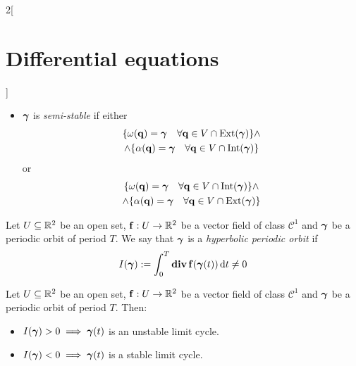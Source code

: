 \documentclass[../../../main_math.tex]{subfiles}
\begin{document}
\begin{multicols}{2}[\section{Differential equations}]
\begin{proposition}
\begin{itemize}
      \item $\boldsymbol{\mathrm{\gamma}}$ is \emph{semi-stable} if either
            \begin{multline*}
              \{\omega(\boldsymbol{\mathrm{q}})=\boldsymbol{\mathrm{\gamma}}\quad\forall \boldsymbol{\mathrm{q}}\in V\cap\operatorname{Ext}(\boldsymbol{\mathrm{\gamma}})\} \land \\\land\{\alpha(\boldsymbol{\mathrm{q}})=\boldsymbol{\mathrm{\gamma}}\quad\forall \boldsymbol{\mathrm{q}}\in V\cap\operatorname{Int}(\boldsymbol{\mathrm{\gamma}})\}
            \end{multline*}
            or
            \begin{multline*}
              \{\omega(\boldsymbol{\mathrm{q}})=\boldsymbol{\mathrm{\gamma}}\quad\forall \boldsymbol{\mathrm{q}}\in V\cap\operatorname{Int}(\boldsymbol{\mathrm{\gamma}})\}\land\\\land \{\alpha(\boldsymbol{\mathrm{q}})=\boldsymbol{\mathrm{\gamma}}\quad\forall \boldsymbol{\mathrm{q}}\in V\cap\operatorname{Ext}(\boldsymbol{\mathrm{\gamma}})\}
            \end{multline*}
    \end{itemize}
  \end{proposition}
  \begin{definition}
    Let $U\subseteq \mathbb{R}^2$ be an open set, $\boldsymbol{\mathrm{f}}:U\rightarrow\mathbb{R}^2$ be a vector field of class $\mathcal{C}^1$ and $\boldsymbol{\mathrm{\gamma}}$ be a periodic orbit of period $T$. We say that $\boldsymbol{\mathrm{\gamma}}$ is a \emph{hyperbolic periodic orbit} if $$I(\boldsymbol{\mathrm{\gamma}}):=\int_0^T\operatorname{\boldsymbol{\mathrm{div}}}\boldsymbol{\mathrm{f}}(\boldsymbol{\mathrm{\gamma}}(t))\dd{t}\ne 0$$
  \end{definition}
  \begin{theorem}
    Let $U\subseteq \mathbb{R}^2$ be an open set, $\boldsymbol{\mathrm{f}}:U\rightarrow\mathbb{R}^2$ be a vector field of class $\mathcal{C}^1$ and $\boldsymbol{\mathrm{\gamma}}$ be a periodic orbit of period $T$. Then:
    \begin{itemize}
      \item $I(\boldsymbol{\mathrm{\gamma}})>0\implies\boldsymbol{\mathrm{\gamma}}(t)$ is an unstable limit cycle.
      \item $I(\boldsymbol{\mathrm{\gamma}})<0\implies\boldsymbol{\mathrm{\gamma}}(t)$ is a stable limit cycle.
    \end{itemize}
  \end{theorem}

\end{multicols}
\end{document}
